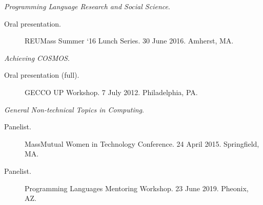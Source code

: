 \documentclass[10pt]{article}
\begin{document}
{    \emph{Programming Language Research and Social Science}.
    \begin{description}
      \item[Oral presentation.] REUMass Summer `16 Lunch Series. 30 June 2016.  Amherst, MA.
    \end{description}
    \vspace{10pt}
    \emph{Achieving COSMOS}.
    \begin{description}
    \item[Oral presentation (full).]  GECCO UP Workshop. 7 July 2012. Philadelphia, PA.
    \end{description}
    \vspace{10pt}
    \emph{General Non-technical Topics in Computing}.
    \begin{description}
      \item[Panelist.] MassMutual Women in Technology Conference. 24 April 2015. Springfield, MA.
      \item[Panelist.] Programming Languages Mentoring Workshop. 23 June 2019. Pheonix, AZ.
    \end{description}
}
\end{document}
